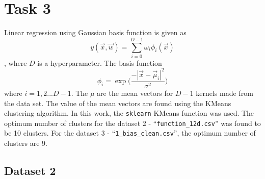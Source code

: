\documentclass[12pt,a4paper]{article}
\def\tt#1{\texttt{#1}}
\begin{document}
\section{Task 3}
Linear regression using Gaussian basis function is given as 
\begin{equation}
    y(\vec{x},\vec{w}) = \sum_{i=0}^{D-1} \omega_{i}\phi_{i}(\vec{x})
\end{equation},
where $D$ is a hyperparameter. The basis function 
\begin{equation}
    \phi_{i} = \exp\Big(\frac{-|\vec{x} - \vec{\mu}_i|^2}{\sigma^2}\Big)
\end{equation}
where $i = 1,2 ... D-1$. The $\mu$ are the mean vectors for $D-1$ kernels made from the data set. The value of the mean vectors are found using the KMeans clustering algorithm. In this work, the \tt{sklearn} KMeans function was used. The optimum number of clusters for the dataset 2 - ``\texttt{function\_12d.csv}'' was found to be 10 clusters. For the dataset 3 - ``\tt{1\_bias\_clean.csv}'', the optimum number of clusters are 9.

\subsection{Dataset 2}
\end{document}
